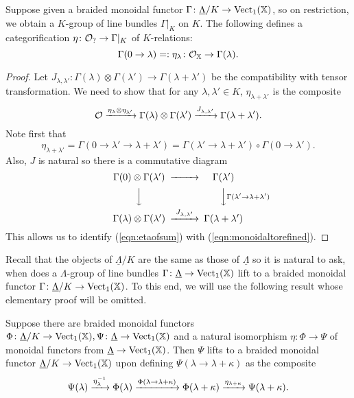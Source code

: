 \documentclass[12pt]{amsart}
\begin{document}
\begin{proposition}  \label{prop:monoidaltorefined}
Suppose given a braided monoidal functor $\Gamma \colon \underline{\Lambda}/K \to \operatorname{Vect}_1(\mathbb{X})$, so on restriction, we obtain a $K$-group of line bundles $\Gamma|_K$ on $K$. The following defines a categorification $\eta \colon \mathcal{O}_? \to \Gamma|_K$ of $K$-relations: 
$$ \Gamma(0 \to \lambda) =: \eta_{\lambda} \colon \mathcal{O}_{\mathbb{X}} \to \Gamma(\lambda).$$
\end{proposition}
\begin{proof}
Let $J_{\lambda, \lambda'} \colon \Gamma(\lambda) \otimes \Gamma(\lambda') \to \Gamma(\lambda + \lambda')$ be the compatibility with tensor transformation. We need to show that for any $\lambda, \lambda' \in K$, $\eta_{\lambda + \lambda'}$ is the composite
\begin{equation} \label{eqn:monoidaltorefined}
\mathcal{O} \xrightarrow{\eta_{\lambda} \otimes \eta_{\lambda'}} \Gamma(\lambda) \otimes \Gamma(\lambda') \xrightarrow{J_{\lambda,\lambda'}} \Gamma(\lambda + \lambda').
\end{equation}
Note first that
\begin{equation}  \label{eqn:etaofsum}
\eta_{\lambda + \lambda'} = 
\Gamma(0 \to \lambda' \to \lambda + \lambda') = 
\Gamma(\lambda' \to \lambda + \lambda') \circ \Gamma(0 \to \lambda').
\end{equation}
Also, $J$ is natural so there is a commutative diagram
\begin{equation*}
\begin{CD}
\Gamma(0) \otimes \Gamma(\lambda') @>>> \Gamma(\lambda') \\
@VVV @VV{\Gamma(\lambda' \to \lambda + \lambda')}V \\
\Gamma(\lambda) \otimes \Gamma(\lambda') @>{J_{\lambda,\lambda'}}>> \Gamma(\lambda + \lambda')
\end{CD}
\end{equation*}
This allows us to identify (\ref{eqn:etaofsum}) with (\ref{eqn:monoidaltorefined}). 
\end{proof}
Recall that the objects of $\underline{\Lambda}/K$ are the same as those of $\underline{\Lambda}$ so it is natural to ask, when does a $\Lambda$-group of line bundles $\Gamma\colon \underline{\Lambda} \to \operatorname{Vect}_1(\mathbb{X})$ lift to a braided monoidal functor $\Gamma\colon \underline{\Lambda}/K \to \operatorname{Vect}_1(\mathbb{X})$. To this end, we will use the following result whose elementary proof will be omitted. 

\begin{proposition}  \label{prop:transferlift}
Suppose there are braided monoidal functors $\Phi\colon \underline{\Lambda}/K \to \operatorname{Vect}_1(\mathbb{X}), \Psi \colon \underline{\Lambda} \to \operatorname{Vect}_1(\mathbb{X})$ and a natural isomorphism $\eta \colon \Phi \to \Psi$ of monoidal functors from $\underline{\Lambda} \to \operatorname{Vect}_1(\mathbb{X})$. Then $\Psi$ lifts to a braided monoidal functor $\underline{\Lambda}/K \to \operatorname{Vect}_1(\mathbb{X})$ upon defining 
$ \Psi(\lambda \to \lambda + \kappa)$
as the composite
$$ \Psi(\lambda) \xrightarrow{\eta^{-1}_{\lambda}} 
\Phi(\lambda) \xrightarrow{\Phi(\lambda \to \lambda + \kappa)} \Phi(\lambda + \kappa) \xrightarrow{\eta_{\lambda + \kappa}} \Psi(\lambda+\kappa).$$
\end{proposition}
\end{document}
